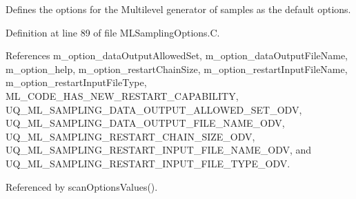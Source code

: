 Defines the options for the Multilevel generator of samples as the default options. 



Definition at line 89 of file M\-L\-Sampling\-Options.\-C.



References m\-\_\-option\-\_\-data\-Output\-Allowed\-Set, m\-\_\-option\-\_\-data\-Output\-File\-Name, m\-\_\-option\-\_\-help, m\-\_\-option\-\_\-restart\-Chain\-Size, m\-\_\-option\-\_\-restart\-Input\-File\-Name, m\-\_\-option\-\_\-restart\-Input\-File\-Type, M\-L\-\_\-\-C\-O\-D\-E\-\_\-\-H\-A\-S\-\_\-\-N\-E\-W\-\_\-\-R\-E\-S\-T\-A\-R\-T\-\_\-\-C\-A\-P\-A\-B\-I\-L\-I\-T\-Y, U\-Q\-\_\-\-M\-L\-\_\-\-S\-A\-M\-P\-L\-I\-N\-G\-\_\-\-D\-A\-T\-A\-\_\-\-O\-U\-T\-P\-U\-T\-\_\-\-A\-L\-L\-O\-W\-E\-D\-\_\-\-S\-E\-T\-\_\-\-O\-D\-V, U\-Q\-\_\-\-M\-L\-\_\-\-S\-A\-M\-P\-L\-I\-N\-G\-\_\-\-D\-A\-T\-A\-\_\-\-O\-U\-T\-P\-U\-T\-\_\-\-F\-I\-L\-E\-\_\-\-N\-A\-M\-E\-\_\-\-O\-D\-V, U\-Q\-\_\-\-M\-L\-\_\-\-S\-A\-M\-P\-L\-I\-N\-G\-\_\-\-R\-E\-S\-T\-A\-R\-T\-\_\-\-C\-H\-A\-I\-N\-\_\-\-S\-I\-Z\-E\-\_\-\-O\-D\-V, U\-Q\-\_\-\-M\-L\-\_\-\-S\-A\-M\-P\-L\-I\-N\-G\-\_\-\-R\-E\-S\-T\-A\-R\-T\-\_\-\-I\-N\-P\-U\-T\-\_\-\-F\-I\-L\-E\-\_\-\-N\-A\-M\-E\-\_\-\-O\-D\-V, and U\-Q\-\_\-\-M\-L\-\_\-\-S\-A\-M\-P\-L\-I\-N\-G\-\_\-\-R\-E\-S\-T\-A\-R\-T\-\_\-\-I\-N\-P\-U\-T\-\_\-\-F\-I\-L\-E\-\_\-\-T\-Y\-P\-E\-\_\-\-O\-D\-V.



Referenced by scan\-Options\-Values().


